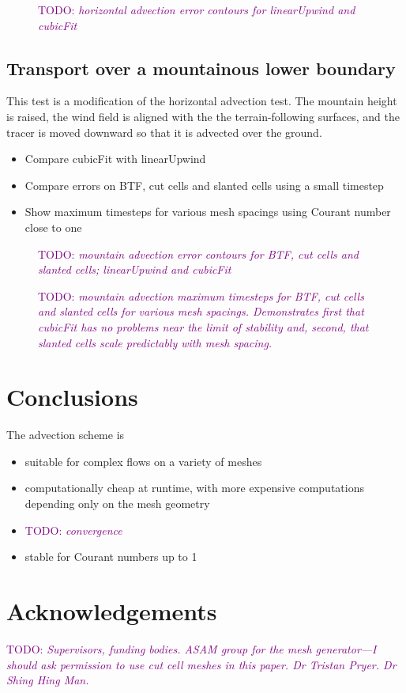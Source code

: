 \documentclass[times]{elsarticle}
\newcommand{\TODO}[1]{\textcolor{purple}{TODO: \emph{#1}}}
\begin{document}
\begin{figure}
	\caption{\TODO{horizontal advection error contours for linearUpwind and cubicFit}}
\end{figure}

\subsection{Transport over a mountainous lower boundary}
This test is a modification of the \citet{schaer2002} horizontal advection test.  The mountain height is raised, the wind field is aligned with the the terrain-following surfaces, and the tracer is moved downward so that it is advected over the ground.

\begin{itemize}
	\item Compare cubicFit with linearUpwind
	\item Compare errors on BTF, cut cells and slanted cells using a small timestep
	\item Show maximum timesteps for various mesh spacings using Courant number close to one
\end{itemize}

\begin{figure}
	\caption{\TODO{mountain advection error contours for BTF, cut cells and slanted cells; linearUpwind and cubicFit}}
\end{figure}

\begin{figure}
	\caption{\TODO{mountain advection maximum timesteps for BTF, cut cells and slanted cells for various mesh spacings.  Demonstrates first that cubicFit has no problems near the limit of stability and, second, that slanted cells scale predictably with mesh spacing.}}
\end{figure}



\section{Conclusions}

The advection scheme is
\begin{itemize}
	\item suitable for complex flows on a variety of meshes
	\item computationally cheap at runtime, with more expensive computations depending only on the mesh geometry
	\item \TODO{convergence}
	\item stable for Courant numbers up to 1
\end{itemize}

\section{Acknowledgements}
\TODO{Supervisors, funding bodies.  ASAM group for the mesh generator---I should ask permission to use cut cell meshes in this paper.  Dr Tristan Pryer.  Dr Shing Hing Man.}





\end{document}
